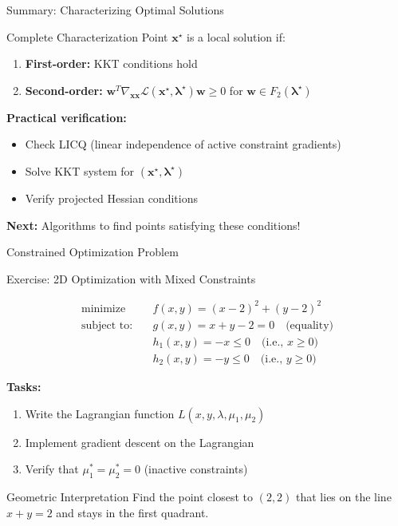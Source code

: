 \documentclass[aspectratio=1610]{beamer}
\begin{document}
\begin{frame}{Summary: Characterizing Optimal Solutions}
  \begin{block}{Complete Characterization}
    Point $\mathbf{x}^{\star}$ is a local solution if:
    \begin{enumerate}
      \item \textbf{First-order:} KKT conditions hold
      \item \textbf{Second-order:} $\mathbf{w}^T \nabla_{\mathbf{x}\mathbf{x}} \mathcal{L}(\mathbf{x}^{\star}, \boldsymbol{\lambda}^{\star}) \mathbf{w} \geq 0$ for $\mathbf{w} \in F_2(\boldsymbol{\lambda}^{\star})$
    \end{enumerate}
  \end{block}

  
  \textbf{Practical verification:}
  \begin{itemize}
    \item Check LICQ (linear independence of active constraint gradients)
    \item Solve KKT system for $(\mathbf{x}^{\star}, \boldsymbol{\lambda}^{\star})$
    \item Verify projected Hessian conditions
  \end{itemize}
  
  \vspace{0.3cm}
  \textbf{Next:} Algorithms to find points satisfying these conditions!
\end{frame}



\begin{frame}{Constrained Optimization Problem}

\begin{block}{Exercise: 2D Optimization with Mixed Constraints}

\begin{align}
\text{minimize} \quad & f(x,y) = (x-2)^2 + (y-2)^2 \\
\text{subject to:} \quad & g(x,y) = x + y - 2 = 0 \quad \text{(equality)} \\
& h_1(x,y) = -x \leq 0 \quad \text{(i.e., } x \geq 0\text{)} \\
& h_2(x,y) = -y \leq 0 \quad \text{(i.e., } y \geq 0\text{)}
\end{align}

\vspace{0.3cm}
\textbf{Tasks:}
\begin{enumerate}
\item Write the Lagrangian function $L(x,y,\lambda,\mu_1,\mu_2)$
\item Implement gradient descent on the Lagrangian
\item Verify that $\mu_1^* = \mu_2^* = 0$ (inactive constraints)
\end{enumerate}
\end{block}

\begin{alertblock}{Geometric Interpretation}
Find the point closest to $(2,2)$ that lies on the line $x + y = 2$ and stays in the first quadrant.
\end{alertblock}

\end{frame}
\end{document}
